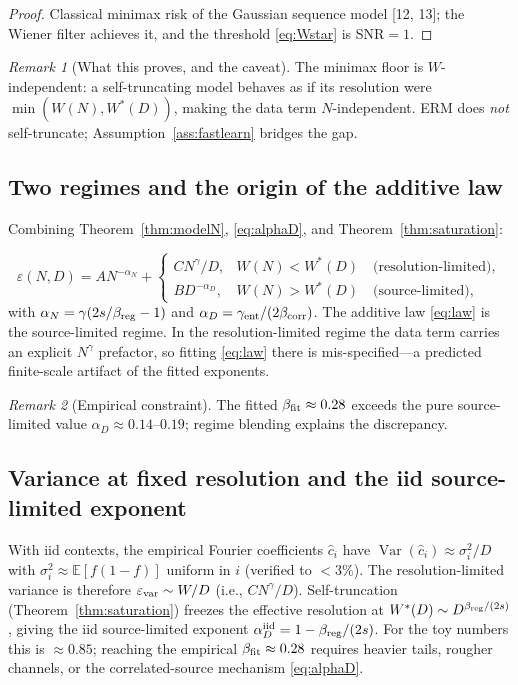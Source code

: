 \documentclass[12pt]{article}
\newcommand{\eps}{\varepsilon}
\newcommand{\E}{\mathbb{E}}
\newcommand{\Var}{\operatorname{Var}}
\theoremstyle{remark}
\newtheorem{remark}{Remark}
\begin{document}
\begin{proof}
Classical minimax risk of the Gaussian sequence model
[12, 13]; the Wiener filter achieves it, and the
threshold \eqref{eq:Wstar} is SNR$=1$.
\end{proof}

\begin{remark}[What this proves, and the caveat]
\label{rem:realizability}
The minimax floor is $W$-independent: a self-truncating model behaves as if its
resolution were $\min(W(N),W^*(D))$, making the data term $N$-independent.
ERM does \emph{not} self-truncate; Assumption~\ref{ass:fastlearn} bridges the gap.
\end{remark}

\subsection{Two regimes and the origin of the additive law}
Combining Theorem~\ref{thm:modelN}, \eqref{eq:alphaD}, and
Theorem~\ref{thm:saturation}:

\begin{equation}
  \eps(N,D) = A N^{-\alpha_N}+
  \begin{cases}
    C N^{\gamma}/D, & W(N)<W^*(D)\quad \text{(resolution-limited)}, \\
    B D^{-\alpha_D}, & W(N)>W^*(D)\quad \text{(source-limited)},
  \end{cases}
  \label{eq:regimes}
\end{equation}
with $\alpha_N=\gamma(2s/\beta_{\rm reg}-1)$ and
$\alpha_D=\gamma_{\rm ent}/(2\beta_{\rm corr})$. The additive law
\eqref{eq:law} is the source-limited regime. In the resolution-limited regime
the data term carries an explicit $N^\gamma$ prefactor, so fitting
\eqref{eq:law} there is mis-specified---a predicted finite-scale artifact of
the fitted exponents.

\begin{remark}[Empirical constraint]
\label{rem:empirical}
The fitted $\beta_{\rm fit}\approx0.28$ exceeds the pure source-limited value
$\alpha_D\approx0.14$--$0.19$; regime blending explains the discrepancy.
\end{remark}

\subsection{Variance at fixed resolution and the iid source-limited exponent}
With iid contexts, the empirical Fourier coefficients $\hat c_i$ have
$\Var(\hat c_i)\approx\sigma_i^2/D$ with $\sigma_i^2\approx\E[f(1-f)]$
uniform in $i$ (verified to $<3\%$).  The resolution-limited variance is
therefore $\eps_{\rm var}\sim W/D$ (i.e., $C N^{\gamma}/D$). Self-truncation
(Theorem~\ref{thm:saturation}) freezes the effective resolution at
$W^*(D)\sim D^{\beta_{\rm reg}/(2s)}$, giving the iid source-limited exponent
$\alpha_D^{\rm iid}=1-\beta_{\rm reg}/(2s)$. For the toy numbers this is
$\approx0.85$; reaching the empirical $\beta_{\rm fit}\approx0.28$ requires
heavier tails, rougher channels, or the correlated-source mechanism
\eqref{eq:alphaD}.
\end{document}
